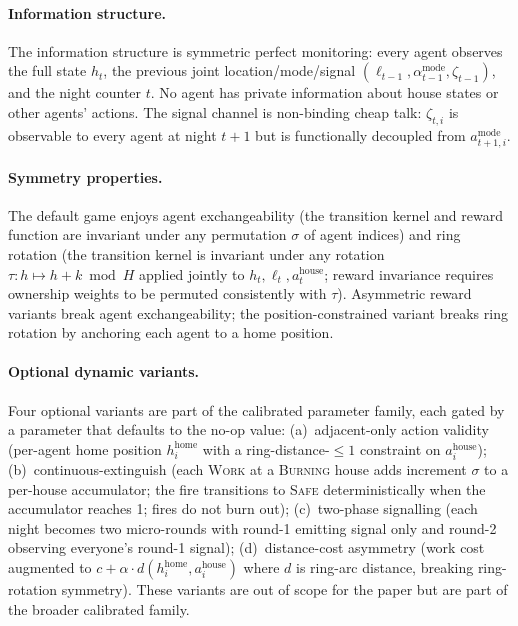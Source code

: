 \documentclass{anvil-paper}
\begin{document}
\paragraph{Information structure.}
The information structure is symmetric perfect monitoring: every agent
observes the full state $h_t$, the previous joint
location/mode/signal $(\ell_{t-1},\alpha_{t-1}^{\text{mode}},
\zeta_{t-1})$, and the night counter $t$. No agent has private
information about house states or other agents' actions. The signal
channel is non-binding cheap talk: $\zeta_{t,i}$ is observable to every
agent at night $t{+}1$ but is functionally decoupled from
$a_{t+1,i}^{\text{mode}}$.

\paragraph{Symmetry properties.}
The default game enjoys agent exchangeability (the transition kernel and
reward function are invariant under any permutation $\sigma$ of agent
indices) and ring rotation (the transition kernel is invariant under any
rotation $\tau:h\mapsto h+k\bmod H$ applied jointly to $h_t,\ell_t,
a_t^{\text{house}}$; reward invariance requires ownership weights to be
permuted consistently with $\tau$). Asymmetric reward variants break
agent exchangeability; the position-constrained variant breaks ring
rotation by anchoring each agent to a home position.

\paragraph{Optional dynamic variants.}
Four optional variants are part of the calibrated parameter family, each
gated by a parameter that defaults to the no-op value: (a)~adjacent-only
action validity (per-agent home position $h^{\text{home}}_i$ with a
ring-distance-${\leq}1$ constraint on $a_i^{\text{house}}$);
(b)~continuous-extinguish (each \textsc{Work} at a \textsc{Burning} house
adds increment $\sigma$ to a per-house accumulator; the fire transitions
to \textsc{Safe} deterministically when the accumulator reaches 1; fires
do not burn out); (c)~two-phase signalling (each night becomes two
micro-rounds with round-1 emitting signal only and round-2 observing
everyone's round-1 signal); (d)~distance-cost asymmetry (work cost
augmented to $c+\alpha\cdot d(h^{\text{home}}_i,a_i^{\text{house}})$
where $d$ is ring-arc distance, breaking ring-rotation symmetry).
These variants are out of scope for the paper but are part of the broader
calibrated family.
\end{document}
